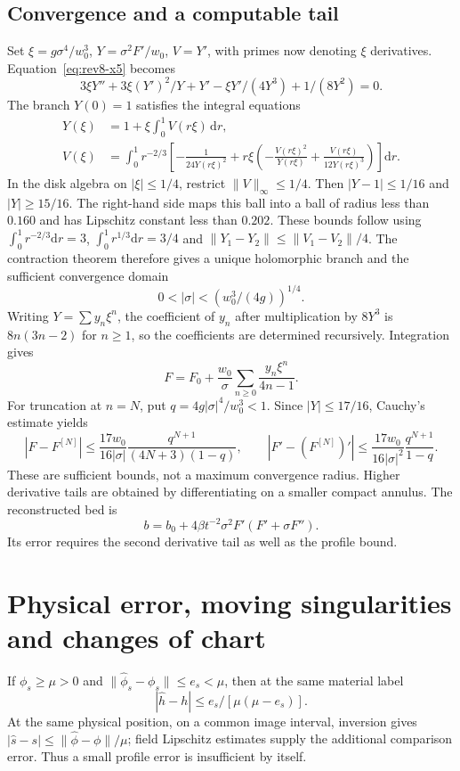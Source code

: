 \documentclass[12pt,a4paper,oneside]{report}
\numberwithin{equation}{chapter}
\theoremstyle{remark}\newtheorem{remark}[theorem]{Remark}
\begin{document}
\subsection{Convergence and a computable tail}
Set $\xi=g\sigma^4/w_0^3$, $Y=\sigma^2F'/w_0$, $V=Y'$, with primes now denoting $\xi$ derivatives. Equation~\eqref{eq:rev8-x5} becomes
\[
 3\xi Y''+3\xi(Y')^2/Y+Y'-\xi Y'/(4Y^3)+1/(8Y^2)=0.
\]
The branch $Y(0)=1$ satisfies the integral equations
\begin{align*}
 Y(\xi)&=1+\xi\int_0^1V(r\xi)\,\mathrm dr,\\
 V(\xi)&=\int_0^1r^{-2/3}\left[-\frac1{24Y(r\xi)^2}
 +r\xi\left(-\frac{V(r\xi)^2}{Y(r\xi)}+\frac{V(r\xi)}{12Y(r\xi)^3}\right)\right]\mathrm dr.
\end{align*}
In the disk algebra on $|\xi|\le1/4$, restrict $\|V\|_\infty\le1/4$. Then $|Y-1|\le1/16$ and $|Y|\ge15/16$. The right-hand side maps this ball into a ball of radius less than $0.160$ and has Lipschitz constant less than $0.202$. These bounds follow using $\int_0^1r^{-2/3}\mathrm dr=3$, $\int_0^1r^{1/3}\mathrm dr=3/4$ and $\|Y_1-Y_2\|\le\|V_1-V_2\|/4$. The contraction theorem therefore gives a unique holomorphic branch and the sufficient convergence domain
\[
 0<|\sigma|<(w_0^3/(4g))^{1/4}.
\]
Writing $Y=\sum y_n\xi^n$, the coefficient of $y_n$ after multiplication by $8Y^3$ is $8n(3n-2)$ for $n\ge1$, so the coefficients are determined recursively. Integration gives
\[
 F=F_0+\frac{w_0}{\sigma}\sum_{n\ge0}\frac{y_n\xi^n}{4n-1}.
\]
For truncation at $n=N$, put $q=4g|\sigma|^4/w_0^3<1$. Since $|Y|\le17/16$, Cauchy's estimate yields
\[
 |F-F^{[N]}|\le\frac{17w_0}{16|\sigma|}\frac{q^{N+1}}{(4N+3)(1-q)},\qquad
 |F'-(F^{[N]})'|\le\frac{17w_0}{16|\sigma|^2}\frac{q^{N+1}}{1-q}.
\]
These are sufficient bounds, not a maximum convergence radius. Higher derivative tails are obtained by differentiating on a smaller compact annulus. The reconstructed bed is
\[
 b=b_0+4\beta t^{-2}\sigma^2F'(F'+\sigma F'').
\]
Its error requires the second derivative tail as well as the profile bound.

\section{Physical error, moving singularities and changes of chart}
If $\phi_s\ge\mu>0$ and $\|\widehat\phi_s-\phi_s\|\le e_s<\mu$, then at the same material label
\[
 |\widehat h-h|\le e_s/[\mu(\mu-e_s)].
\]
At the same physical position, on a common image interval, inversion gives $|\widehat s-s|\le\|\widehat\phi-\phi\|/\mu$; field Lipschitz estimates supply the additional comparison error. Thus a small profile error is insufficient by itself.
\end{document}
